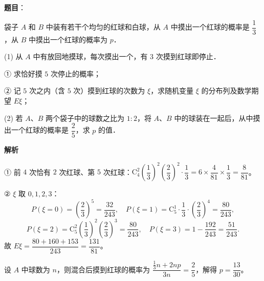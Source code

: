 \begin{answer}

\textbf{题目}：

袋子 $A$ 和 $B$ 中装有若干个均匀的红球和白球，从 $A$ 中摸出一个红球的概率是 $\dfrac{1}{3}$，从 $B$ 中摸出一个红球的概率为 $p$．

(1) 从 $A$ 中有放回地摸球，每次摸出一个，有 $3$ 次摸到红球即停止．

① 求恰好摸 $5$ 次停止的概率；

② 记 $5$ 次之内（含 $5$ 次）摸到红球的次数为 $\xi$，求随机变量 $\xi$ 的分布列及数学期望 $E\xi$；

(2) 若 $A$、$B$ 两个袋子中的球数之比为 $1:2$，将 $A$、$B$ 中的球装在一起后，从中摸出一个红球的概率是 $\dfrac{2}{5}$，求 $p$ 的值．

\textbf{解析}


① 前 $4$ 次恰有 $2$ 次红球、第 $5$ 次红球：$\mathrm{C}_4^2\left(\dfrac{1}{3}\right)^2\left(\dfrac{2}{3}\right)^2 \cdot \dfrac{1}{3} = 6 \times \dfrac{4}{81} \times \dfrac{1}{3} = \dfrac{8}{81}$。

② $\xi$ 取 $0, 1, 2, 3$：
\nopagebreak[4]
\[
P(\xi = 0) = \left(\frac{2}{3}\right)^5 = \frac{32}{243},\quad P(\xi = 1) = \mathrm{C}_5^1\cdot\frac{1}{3}\cdot\left(\frac{2}{3}\right)^4 = \frac{80}{243},
\]
\nopagebreak[4]
\[
P(\xi = 2) = \mathrm{C}_5^2\left(\frac{1}{3}\right)^2\left(\frac{2}{3}\right)^3 = \frac{80}{243},\quad P(\xi = 3) = 1 - \frac{192}{243} = \frac{51}{243}.
\]
故 $E\xi = \dfrac{80 + 160 + 153}{243} = \dfrac{131}{81}$。


设 $A$ 中球数为 $n$，则混合后摸到红球的概率为 $\dfrac{\frac{1}{3}n + 2np}{3n} = \dfrac{2}{5}$，解得 $p = \dfrac{13}{30}$。



\end{answer}
